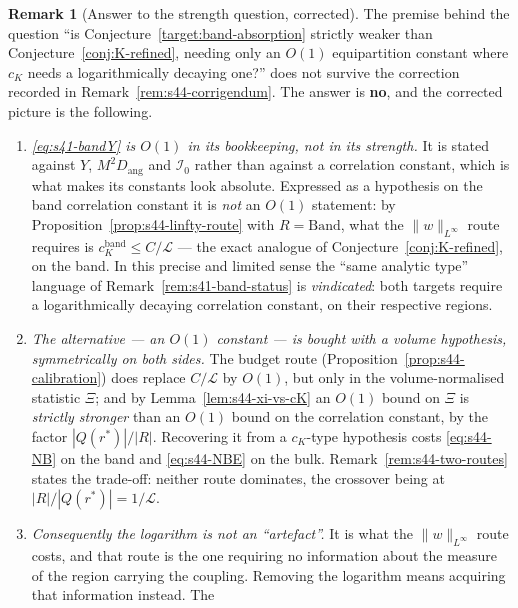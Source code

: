 \documentclass[11pt]{article}
\theoremstyle{definition}
\newtheorem{remark}[theorem]{Remark}
\theoremstyle{remark}
\begin{document}
\begin{remark}[Answer to the strength question, corrected]
  \label{rem:s44-strength}
  The premise behind the question ``is
  Conjecture~\ref{target:band-absorption} strictly weaker than
  Conjecture~\ref{conj:K-refined}, needing only an $O(1)$ equipartition
  constant where $c_K$ needs a logarithmically decaying one?'' does not
  survive the correction recorded in Remark~\ref{rem:s44-corrigendum}. The
  answer is \textbf{no}, and the corrected picture is the following.
  \begin{enumerate}[label=(\arabic*)]
    \item \emph{\eqref{eq:s41-bandY} is $O(1)$ in its bookkeeping, not in its
      strength.} It is stated against $Y$, $M^2D_{\mathrm{ang}}$ and
      $\mathcal{I}_0$ rather than against a correlation constant, which is
      what makes its constants look absolute. Expressed as a hypothesis on the
      band correlation constant it is \emph{not} an $O(1)$ statement: by
      Proposition~\ref{prop:s44-linfty-route} with $R=\mathrm{Band}$, what the
      $\|w\|_{L^\infty}$ route requires is
      $c_K^{\mathrm{band}}\leq C/\mathcal{L}$ --- the exact analogue of
      Conjecture~\ref{conj:K-refined}, on the band. In this precise and
      limited sense the ``same analytic type'' language of
      Remark~\ref{rem:s41-band-status} is \emph{vindicated}: both targets
      require a logarithmically decaying correlation constant, on their
      respective regions.
    \item \emph{The alternative --- an $O(1)$ constant --- is bought with a
      volume hypothesis, symmetrically on both sides.} The budget route
      (Proposition~\ref{prop:s44-calibration}) does replace $C/\mathcal{L}$ by
      $O(1)$, but only in the volume-normalised statistic $\Xi$; and by
      Lemma~\ref{lem:s44-xi-vs-cK} an $O(1)$ bound on $\Xi$ is
      \emph{strictly stronger} than an $O(1)$ bound on the correlation
      constant, by the factor $|Q(r^*)|/|R|$. Recovering it from a $c_K$-type
      hypothesis costs \eqref{eq:s44-NB} on the band and \eqref{eq:s44-NBE} on
      the bulk. Remark~\ref{rem:s44-two-routes} states the trade-off: neither
      route dominates, the crossover being at $|R|/|Q(r^*)|=1/\mathcal{L}$.
    \item \emph{Consequently the logarithm is not an ``artefact''.} It is what
      the $\|w\|_{L^\infty}$ route costs, and that route is the one requiring
      no information about the measure of the region carrying the coupling.
      Removing the logarithm means acquiring that information instead. The

\end{enumerate}
\end{remark}
\end{document}
